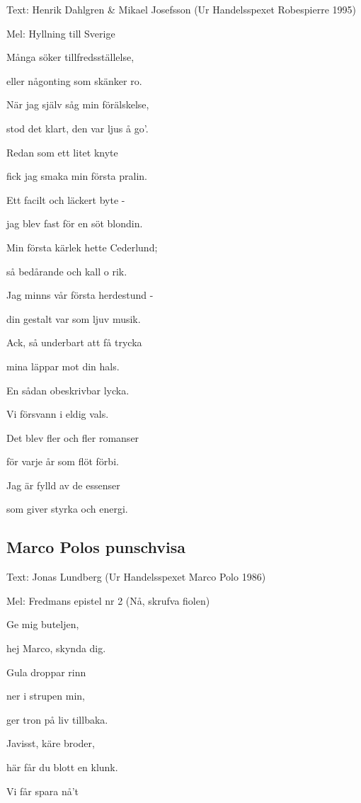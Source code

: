 Text: Henrik Dahlgren \& Mikael Josefsson (Ur Handelsspexet
Robespierre 1995)

Mel: Hyllning till Sverige\bigskip

Många söker tillfredsställelse,

eller någonting som skänker ro.

När jag själv såg min förälskelse,

stod det klart, den var ljus å go’.\bigskip

Redan som ett litet knyte

fick jag smaka min första pralin.

Ett facilt och läckert byte -

jag blev fast för en söt blondin.\bigskip

Min första kärlek hette Cederlund;

så bedårande och kall o rik.

Jag minns vår första herdestund -

din gestalt var som ljuv musik.\bigskip

Ack, så underbart att få trycka

mina läppar mot din hals.

En sådan obeskrivbar lycka.

Vi försvann i eldig vals.\bigskip

Det blev fler och fler romanser

för varje år som flöt förbi.

Jag är fylld av de essenser

som giver styrka och energi.\bigskip

\subsection{\textbf{Marco Polos punschvisa}}

Text: Jonas Lundberg (Ur Handelsspexet Marco Polo 1986)

Mel: Fredmans epistel nr 2 (Nå, skrufva fiolen)\bigskip

Ge mig buteljen,

hej Marco, skynda dig.

Gula droppar rinn

ner i strupen min,

ger tron på liv tillbaka.\bigskip

Javisst, käre broder,

här får du blott en klunk.

Vi får spara nå’t

